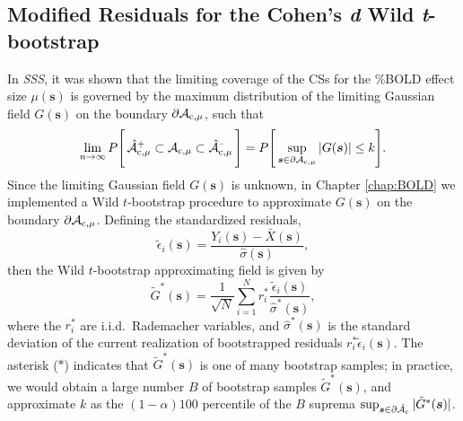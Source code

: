 \subsection{Modified Residuals for the Cohen's \textit{d} Wild \textit{t}-bootstrap}
\label{sec:Wild_t_bootstrap}
In \textit{SSS}, it was shown that the limiting coverage of the CSs for the \%BOLD effect size $\mu(\bm{s})$ is governed by the maximum distribution of the limiting Gaussian field $G(\bm{s})$ on the boundary $\operatorname{\partial\mathcal{A}_{c,\mu}}$, such that
\begin{equation}
\label{Result_1}
\lim_{n\rightarrow\infty} P  \Bigg[\operatorname{\hat{\mathcal{A}}_{c,\mu}^+} \subset \operatorname{\mathcal{A}_{c,\mu}} \subset \operatorname{\hat{\mathcal{A}}_{c,\mu}^{\textrm{--}}} \Bigg] = P \Bigg[\sup_{\bm{s}\in\operatorname{\partial\mathcal{A}_{c,\mu}}}|G(\bm{s})|\leq k\Bigg].
\end{equation}
Since the limiting Gaussian field $G(\bm{s})$ is unknown, in Chapter \ref{chap:BOLD} we implemented a Wild $t$-bootstrap procedure to approximate $G(\bm{s})$ on the boundary $\operatorname{\partial\mathcal{A}_{c,\mu}}$. Defining the standardized residuals,
\begin{equation}
\label{eq:standardized_residuals}
\tilde{\epsilon}_{i}(\bm{s}) = \frac{ Y_{i}(\bm{s}) - \bar{X}(\bm{s})}{\hat{\sigma}(\bm{s})},
\end{equation}
then the Wild $t$-bootstrap approximating field is given by
\begin{equation}
\label{eq:wild_bootstrap_approximating_field}
\tilde{G}^{*}(\bm{s}) = \frac{1}{\sqrt{N}}\sum_{i=1}^{N} r^*_i\frac{\tilde{\epsilon}_{i}(\bm{s})}{\hat{\sigma}^*(\bm{s})},
\end{equation}
where the $r^{*}_i$ are i.i.d.\ Rademacher variables, and $\hat{\sigma}^{*}(\bm{s})$ is the standard deviation of the current realization of bootstrapped residuals $r^{*}_i\tilde{\epsilon}_{i}(\bm{s})$. The asterisk ($*$) indicates that $\tilde{G}^{*}(\bm{s})$ is one of many bootstrap samples; in practice, we would obtain a large number $B$ of bootstrap samples $\tilde{G}^{*}(\bm{s})$, and approximate $k$ as the $(1 - \alpha)100$ percentile of the $B$ suprema $\sup_{\bm{s}\in\operatorname{\partial\hat{\mathcal{A}}_{c}}}|\tilde{G}^*(\bm{s})|$.

